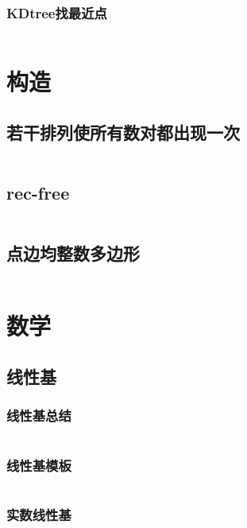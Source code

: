 \documentclass{article}
\begin{document}
\subsubsection{KDtree找最近点}
\inputminted[breaklines]{c++}{../数据结构/KDtree找最近点.cpp}

\newpage
\section{构造}
\subsection{若干排列使所有数对都出现一次}
\inputminted[breaklines]{c++}{../构造/若干排列使所有数对都出现一次.cpp}

\subsection{rec-free}
\inputminted[breaklines]{c++}{../构造/rec-free.cpp}

\subsection{点边均整数多边形}
\inputminted[breaklines]{c++}{../构造/点边均整数多边形.cpp}

\newpage
\section{数学}
\subsection{线性基}
\subsubsection{线性基总结}
\inputminted[breaklines]{text}{../数学/线性基总结.txt}

\subsubsection{线性基模板}
\inputminted[breaklines]{c++}{../数学/线性基模板.cpp}

\subsubsection{实数线性基}
\inputminted[breaklines]{c++}{../数学/实数线性基.cpp}
\end{document}
